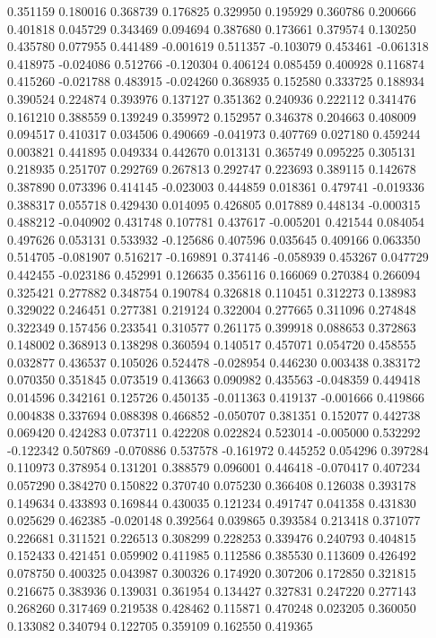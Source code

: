 0.351159
0.180016
0.368739
0.176825
0.329950
0.195929
0.360786
0.200666
0.401818
0.045729
0.343469
0.094694
0.387680
0.173661
0.379574
0.130250
0.435780
0.077955
0.441489
-0.001619
0.511357
-0.103079
0.453461
-0.061318
0.418975
-0.024086
0.512766
-0.120304
0.406124
0.085459
0.400928
0.116874
0.415260
-0.021788
0.483915
-0.024260
0.368935
0.152580
0.333725
0.188934
0.390524
0.224874
0.393976
0.137127
0.351362
0.240936
0.222112
0.341476
0.161210
0.388559
0.139249
0.359972
0.152957
0.346378
0.204663
0.408009
0.094517
0.410317
0.034506
0.490669
-0.041973
0.407769
0.027180
0.459244
0.003821
0.441895
0.049334
0.442670
0.013131
0.365749
0.095225
0.305131
0.218935
0.251707
0.292769
0.267813
0.292747
0.223693
0.389115
0.142678
0.387890
0.073396
0.414145
-0.023003
0.444859
0.018361
0.479741
-0.019336
0.388317
0.055718
0.429430
0.014095
0.426805
0.017889
0.448134
-0.000315
0.488212
-0.040902
0.431748
0.107781
0.437617
-0.005201
0.421544
0.084054
0.497626
0.053131
0.533932
-0.125686
0.407596
0.035645
0.409166
0.063350
0.514705
-0.081907
0.516217
-0.169891
0.374146
-0.058939
0.453267
0.047729
0.442455
-0.023186
0.452991
0.126635
0.356116
0.166069
0.270384
0.266094
0.325421
0.277882
0.348754
0.190784
0.326818
0.110451
0.312273
0.138983
0.329022
0.246451
0.277381
0.219124
0.322004
0.277665
0.311096
0.274848
0.322349
0.157456
0.233541
0.310577
0.261175
0.399918
0.088653
0.372863
0.148002
0.368913
0.138298
0.360594
0.140517
0.457071
0.054720
0.458555
0.032877
0.436537
0.105026
0.524478
-0.028954
0.446230
0.003438
0.383172
0.070350
0.351845
0.073519
0.413663
0.090982
0.435563
-0.048359
0.449418
0.014596
0.342161
0.125726
0.450135
-0.011363
0.419137
-0.001666
0.419866
0.004838
0.337694
0.088398
0.466852
-0.050707
0.381351
0.152077
0.442738
0.069420
0.424283
0.073711
0.422208
0.022824
0.523014
-0.005000
0.532292
-0.122342
0.507869
-0.070886
0.537578
-0.161972
0.445252
0.054296
0.397284
0.110973
0.378954
0.131201
0.388579
0.096001
0.446418
-0.070417
0.407234
0.057290
0.384270
0.150822
0.370740
0.075230
0.366408
0.126038
0.393178
0.149634
0.433893
0.169844
0.430035
0.121234
0.491747
0.041358
0.431830
0.025629
0.462385
-0.020148
0.392564
0.039865
0.393584
0.213418
0.371077
0.226681
0.311521
0.226513
0.308299
0.228253
0.339476
0.240793
0.404815
0.152433
0.421451
0.059902
0.411985
0.112586
0.385530
0.113609
0.426492
0.078750
0.400325
0.043987
0.300326
0.174920
0.307206
0.172850
0.321815
0.216675
0.383936
0.139031
0.361954
0.134427
0.327831
0.247220
0.277143
0.268260
0.317469
0.219538
0.428462
0.115871
0.470248
0.023205
0.360050
0.133082
0.340794
0.122705
0.359109
0.162550
0.419365
